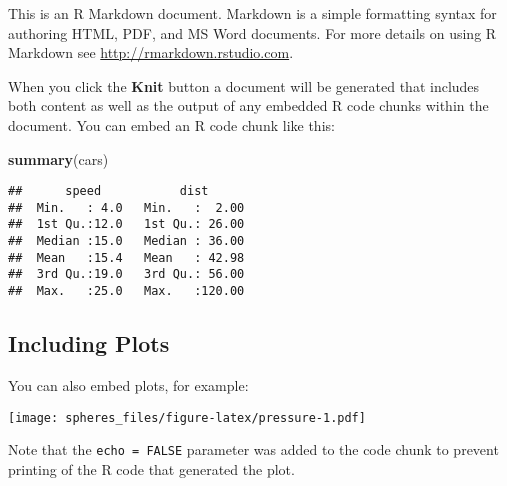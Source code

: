 \documentclass[]{article}
\newenvironment{Shaded}{\begin{snugshade}}{\end{snugshade}}
\newcommand{\KeywordTok}[1]{\textcolor[rgb]{0.13,0.29,0.53}{\textbf{{#1}}}}
\newcommand{\NormalTok}[1]{{#1}}
\begin{document}
This is an R Markdown document. Markdown is a simple formatting syntax
for authoring HTML, PDF, and MS Word documents. For more details on
using R Markdown see \url{http://rmarkdown.rstudio.com}.

When you click the \textbf{Knit} button a document will be generated
that includes both content as well as the output of any embedded R code
chunks within the document. You can embed an R code chunk like this:

\begin{Shaded}
\begin{Highlighting}[]
\KeywordTok{summary}\NormalTok{(cars)}
\end{Highlighting}
\end{Shaded}

\begin{verbatim}
##      speed           dist       
##  Min.   : 4.0   Min.   :  2.00  
##  1st Qu.:12.0   1st Qu.: 26.00  
##  Median :15.0   Median : 36.00  
##  Mean   :15.4   Mean   : 42.98  
##  3rd Qu.:19.0   3rd Qu.: 56.00  
##  Max.   :25.0   Max.   :120.00
\end{verbatim}

\subsection{Including Plots}\label{including-plots}

You can also embed plots, for example:

\texttt{[image: spheres\_files/figure-latex/pressure-1.pdf]}

Note that the \texttt{echo\ =\ FALSE} parameter was added to the code
chunk to prevent printing of the R code that generated the plot.
\end{document}
